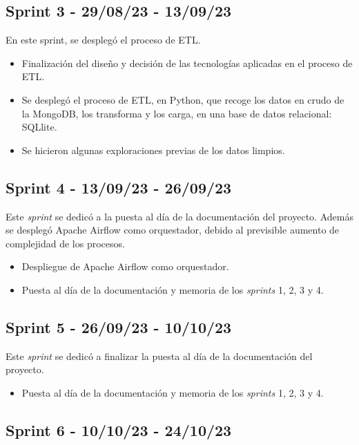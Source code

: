 \subsection{Sprint 3 - 29/08/23 - 13/09/23}

En este sprint, se desplegó el proceso de ETL.

\begin{itemize}
    \item Finalización del diseño y decisión de las tecnologías aplicadas en el proceso de ETL.
    \item Se desplegó el proceso de ETL, en Python, que recoge los datos en crudo de la MongoDB, los transforma y los carga, en una base de datos relacional: SQLlite.
    \item Se hicieron algunas exploraciones previas de los datos limpios.
\end{itemize}

\subsection{Sprint 4 -  13/09/23 - 26/09/23}

Este \textit{sprint} se dedicó a la puesta al día de la documentación del proyecto. Además se desplegó Apache Airflow como orquestador, debido al previsible aumento de complejidad de los procesos.

\begin{itemize}
    \item Despliegue de Apache Airflow como orquestador.
    \item Puesta al día de la documentación y memoria de los \textit{sprints} 1, 2, 3 y 4.
\end{itemize}

\subsection{Sprint 5 -  26/09/23 - 10/10/23}

Este \textit{sprint} se dedicó a finalizar la puesta al día de la documentación del proyecto.

\begin{itemize}
    \item Puesta al día de la documentación y memoria de los \textit{sprints} 1, 2, 3 y 4.
\end{itemize}

\subsection{Sprint 6 -  10/10/23 - 24/10/23}

